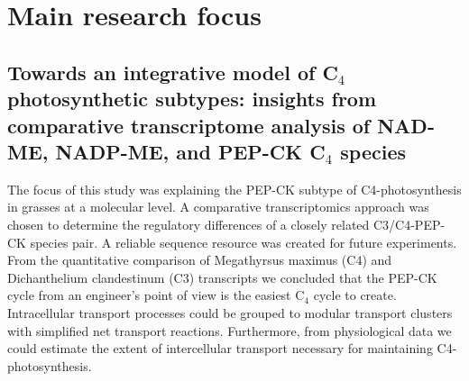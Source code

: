 \section{Main research focus}
\subsection{Towards an integrative model of C$_4$ photosynthetic subtypes: insights from comparative transcriptome analysis of NAD-ME, NADP-ME, and PEP-CK C$_4$ species \cite{mp_Braeutigam2014}}
The focus of this study was explaining the PEP-CK subtype of C4-photosynthesis in grasses at a molecular level.
A comparative transcriptomics approach was chosen to determine the regulatory differences of a closely related C3/C4-PEP-CK species pair.
A reliable sequence resource was created for future experiments.
From the quantitative comparison of Megathyrsus maximus (C4) and Dichanthelium clandestinum (C3) transcripts we concluded that the PEP-CK cycle from an engineer's point of view is the easiest C$_4$ cycle to create.
Intracellular transport processes could be grouped to modular transport clusters with simplified net transport reactions.
Furthermore, from physiological data we could estimate the extent of intercellular transport necessary for maintaining C4-photosynthesis.



